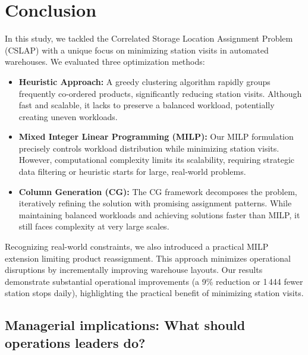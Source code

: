 \documentclass[11pt]{elsarticle}
\begin{document}
\section{Conclusion}
\label{sec:conclusion}

In this study, we tackled the Correlated Storage Location Assignment Problem (CSLAP) with a unique focus on minimizing station visits in automated warehouses. We evaluated three optimization methods:
\begin{itemize}
    \item \textbf{Heuristic Approach:} A greedy clustering algorithm rapidly groups frequently co-ordered products, significantly reducing station visits. Although fast and scalable, it lacks to preserve a balanced workload, potentially creating uneven workloads.
    \item \textbf{Mixed Integer Linear Programming (MILP):} Our MILP formulation precisely controls workload distribution while minimizing station visits. However, computational complexity limits its scalability, requiring strategic data filtering or heuristic starts for large, real-world problems.
    \item \textbf{Column Generation (CG):} The CG framework decomposes the problem, iteratively refining the solution with promising assignment patterns. While maintaining balanced workloads and achieving solutions faster than MILP, it still faces complexity at very large scales.
\end{itemize}

Recognizing real-world constraints, we also introduced a practical MILP extension limiting product reassignment. This approach minimizes operational disruptions by incrementally improving warehouse layouts. Our results demonstrate substantial operational improvements (a 9\% reduction or 1\,444 fewer station stops daily), highlighting the practical benefit of minimizing station visits. 

\subsection*{Managerial implications: What should operations leaders do?}
\end{document}
